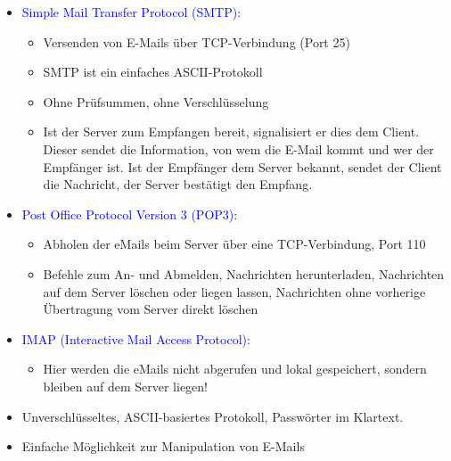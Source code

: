 \begin{itemize}
    \item \textcolor{blue}{Simple Mail Transfer Protocol (SMTP):}
    \begin{itemize}
        \item Versenden von E-Mails über TCP-Verbindung (Port 25)
        \item SMTP ist ein einfaches ASCII-Protokoll
        \item Ohne Prüfsummen, ohne Verschlüsselung
        \item Ist der Server zum Empfangen bereit, signalisiert er dies dem Client.
        Dieser sendet die Information, von wem die E-Mail kommt und wer der Empfänger ist.
        Ist der Empfänger dem Server bekannt, sendet der Client die Nachricht, der Server bestätigt den Empfang.
    \end{itemize}
    \item \textcolor{blue}{Post Office Protocol Version 3 (POP3):}
    \begin{itemize}
        \item Abholen der eMails beim Server über eine TCP-Verbindung, Port 110
        \item Befehle zum An- und Abmelden, Nachrichten herunterladen, Nachrichten auf dem Server löschen oder liegen lassen, Nachrichten ohne vorherige Übertragung vom Server direkt löschen
    \end{itemize}
    \item \textcolor{blue}{IMAP (Interactive Mail Access Protocol):}
    \begin{itemize}
        \item Hier werden die eMails nicht abgerufen und lokal gespeichert, sondern bleiben auf dem Server liegen!
    \end{itemize}
\end{itemize}

\begin{itemize}
    \item Unverschlüsseltes, ASCII-basiertes Protokoll, Passwörter im Klartext.
    \item Einfache Möglichkeit zur Manipulation von E-Mails
\end{itemize}

